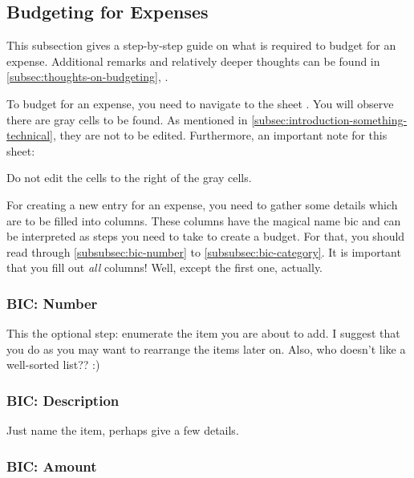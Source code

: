 \subsection{Budgeting for Expenses}
\label{subsec:budgeting-expenses}

This subsection gives a step-by-step guide on what is required to budget for an expense.
Additional remarks and relatively deeper thoughts can be found in \autoref{subsec:thoughts-on-budgeting}, .

To budget for an expense, you need to navigate to the sheet .
You will observe there are gray cells to be found.
As mentioned in \autoref{subsec:introduction-something-technical}, they are not to be edited.
Furthermore, an important note for this sheet:
\begin{specialnote}
	Do not edit the cells to the right of the gray cells.
\end{specialnote}

For creating a new entry for an expense, you need to gather some details which are to be filled into columns.
These columns have the magical name \ac{bic} and can be interpreted as steps you need to take to create a budget.
For that, you should read through \autoref{subsubsec:bic-number} to \autoref{subsubsec:bic-category}.
It is important that you fill out \emph{all} columns!
Well, except the first one, actually.

\subsubsection{BIC: Number}
\label{subsubsec:bic-number}

This the optional step: enumerate the item you are about to add.
I suggest that you do as you may want to rearrange the items later on.
Also, who doesn't like a well-sorted list?? :)

\subsubsection{BIC: Description}
\label{subsubsec:bic-description}

Just name the item, perhaps give a few details.

\subsubsection{BIC: Amount}
\label{subsubsec:bic-amount}

